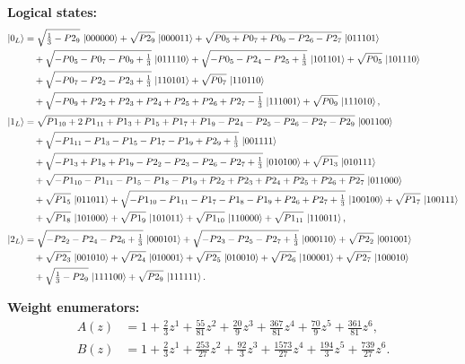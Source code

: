 \documentclass[11pt]{article}
\begin{document}
\noindent\textbf{Logical states:}
\begin{align*}
\ket{0_L} &= \sqrt{\tfrac{1}{3} - P2_9}\,\ket{000000} + \sqrt{P2_9}\,\ket{000011} + \sqrt{P0_5 + P0_7 + P0_9 - P2_6 - P2_7}\,\ket{011101}\\
&\quad + \sqrt{-P0_5 - P0_7 - P0_9 + \tfrac{1}{3}}\,\ket{011110} + \sqrt{-P0_5 - P2_4 - P2_5 + \tfrac{1}{3}}\,\ket{101101} + \sqrt{P0_5}\,\ket{101110}\\
&\quad + \sqrt{-P0_7 - P2_2 - P2_3 + \tfrac{1}{3}}\,\ket{110101} + \sqrt{P0_7}\,\ket{110110}\\
&\quad + \sqrt{-P0_9 + P2_2 + P2_3 + P2_4 + P2_5 + P2_6 + P2_7 - \tfrac{1}{3}}\,\ket{111001} + \sqrt{P0_9}\,\ket{111010},
\\[2pt]
\ket{1_L} &= \sqrt{P1_{10} + 2\,P1_{11} + P1_3 + P1_5 + P1_7 + P1_9 - P2_4 - P2_5 - P2_6 - P2_7 - P2_9}\,\ket{001100}\\
&\quad + \sqrt{-P1_{11} - P1_3 - P1_5 - P1_7 - P1_9 + P2_9 + \tfrac{1}{3}}\,\ket{001111}\\
&\quad + \sqrt{-P1_3 + P1_8 + P1_9 - P2_2 - P2_3 - P2_6 - P2_7 + \tfrac{1}{3}}\,\ket{010100} + \sqrt{P1_3}\,\ket{010111}\\
&\quad + \sqrt{-P1_{10} - P1_{11} - P1_5 - P1_8 - P1_9 + P2_2 + P2_3 + P2_4 + P2_5 + P2_6 + P2_7}\,\ket{011000}\\
&\quad + \sqrt{P1_5}\,\ket{011011} + \sqrt{-P1_{10} - P1_{11} - P1_7 - P1_8 - P1_9 + P2_6 + P2_7 + \tfrac{1}{3}}\,\ket{100100} + \sqrt{P1_7}\,\ket{100111}\\
&\quad + \sqrt{P1_8}\,\ket{101000} + \sqrt{P1_9}\,\ket{101011} + \sqrt{P1_{10}}\,\ket{110000} + \sqrt{P1_{11}}\,\ket{110011},
\\[2pt]
\ket{2_L} &= \sqrt{-P2_2 - P2_4 - P2_6 + \tfrac{1}{3}}\,\ket{000101} + \sqrt{-P2_3 - P2_5 - P2_7 + \tfrac{1}{3}}\,\ket{000110} + \sqrt{P2_2}\,\ket{001001}\\
&\quad + \sqrt{P2_3}\,\ket{001010} + \sqrt{P2_4}\,\ket{010001} + \sqrt{P2_5}\,\ket{010010} + \sqrt{P2_6}\,\ket{100001} + \sqrt{P2_7}\,\ket{100010}\\
&\quad + \sqrt{\tfrac{1}{3} - P2_9}\,\ket{111100} + \sqrt{P2_9}\,\ket{111111}.
\end{align*}

\noindent\textbf{Weight enumerators:}
\begin{align*}
A(z) &= 1 + \tfrac{2}{3}z^{1} + \tfrac{55}{81}z^{2} + \tfrac{20}{9}z^{3} + \tfrac{367}{81}z^{4} + \tfrac{70}{9}z^{5} + \tfrac{361}{81}z^{6},\\[2pt]
B(z) &= 1 + \tfrac{2}{3}z^{1} + \tfrac{253}{27}z^{2} + \tfrac{92}{3}z^{3} + \tfrac{1573}{27}z^{4} + \tfrac{194}{3}z^{5} + \tfrac{739}{27}z^{6}.
\end{align*}
\end{document}
